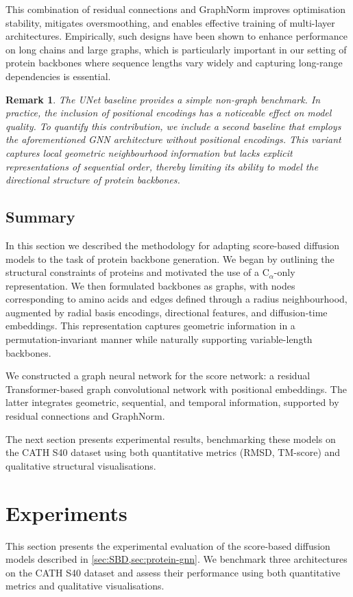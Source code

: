 \documentclass[a4paper,12pt]{article}
\newtheorem{remark}{Remark}[section]
\begin{document}
This combination of residual connections and GraphNorm improves optimisation stability, mitigates oversmoothing, and enables effective training of multi-layer architectures. Empirically, such designs have been shown to enhance performance on long chains and large graphs, which is particularly important in our setting of protein backbones where sequence lengths vary widely and capturing long-range dependencies is essential.
\begin{remark}
    The UNet baseline provides a simple non-graph benchmark. In practice, the inclusion of positional encodings has a noticeable effect on model quality. To quantify this contribution, we include a second baseline that employs the aforementioned GNN architecture without positional encodings. This variant captures local geometric neighbourhood information but lacks explicit representations of sequential order, thereby limiting its ability to model the directional structure of protein backbones.
\end{remark}

\subsection{Summary}\label{subsec:method-summary}
In this section we described the methodology for adapting score-based diffusion models to the task of protein backbone generation. We began by outlining the structural constraints of proteins and motivated the use of a C\(_\alpha\)-only representation. We then formulated backbones as graphs, with nodes corresponding to amino acids and edges defined through a radius neighbourhood, augmented by radial basis encodings, directional features, and diffusion-time embeddings. This representation captures geometric information in a permutation-invariant manner while naturally supporting variable-length backbones.

We constructed a graph neural network for the score network: a residual Transformer-based graph convolutional network with positional embeddings. The latter integrates geometric, sequential, and temporal information, supported by residual connections and GraphNorm.

The next section presents experimental results, benchmarking these models on the CATH S40 dataset using both quantitative metrics (RMSD, TM-score) and qualitative structural visualisations.

\clearpage

\section{Experiments}\label{sec:Experiments}
This section presents the experimental evaluation of the score-based diffusion models described in \cref{sec:SBD,sec:protein-gnn}. We benchmark three architectures on the CATH S40 dataset and assess their performance using both quantitative metrics and qualitative visualisations.
\end{document}
